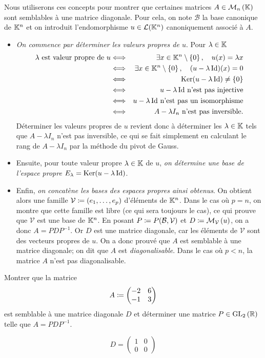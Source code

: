 \documentclass{magnolia}
\begin{document}
Nous utiliserons ces concepts pour montrer que certaines matrices
$A\in\mathcal{M}_{n}\left(\mathbb{K}\right)$ sont semblables à une matrice diagonale. Pour cela, on note
$\mathcal{B}$ la base canonique de $\mathbb{K}^n$ et on introduit
l'endomorphisme $u\in\mathcal{L}(\mathbb{K}^n)$ canoniquement associé à $A$.
\begin{itemize}
\item \emph{On commence par déterminer les valeurs propres de $u$}. Pour $\lambda\in\mathbb{K}$
\begin{eqnarray*}
\text{$\lambda$ est valeur propre de $u$}
&\Longleftrightarrow& \exists x\in \mathbb{K}^n \setminus\left\{0\right\} ,\quad u(x)=\lambda x\\
&\Longleftrightarrow& \exists x\in \mathbb{K}^n \setminus\left\{0\right\} ,\quad (u-\lambda \operatorname{Id})(x)=0\\
&\Longleftrightarrow& \mathop{\rm Ker}(u-\lambda \operatorname{Id})\neq\left\{0\right\}\\
&\Longleftrightarrow& \text{$u-\lambda \operatorname{Id}$ n'est pas injective}\\
&\Longleftrightarrow& \text{$u-\lambda \operatorname{Id}$ n'est pas un isomorphisme}\\
&\Longleftrightarrow& \text{$A-\lambda I_n$ n'est pas inversible.}
\end{eqnarray*}
Déterminer les valeurs propres de $u$ revient donc à déterminer les $\lambda\in\mathbb{K}$
tels que $A-\lambda I_n$ n'est pas inversible, ce qui se fait simplement en calculant
le rang de $A-\lambda I_n$ par la méthode du pivot de Gauss.
\item Ensuite, pour toute valeur propre $\lambda\in\mathbb{K}$ de $u$, \emph{on détermine une base
  de l'espace propre $E_\lambda=\mathop{\rm Ker}(u-\lambda \operatorname{Id})$}.
\item Enfin, \emph{on concatène les bases des espaces propres ainsi obtenus}. On obtient
  alors une famille $\mathcal{V}\coloneqq(e_1,\ldots,e_p)$ d'éléments de $\mathbb{K}^n$. Dans le cas où $p=n$, on montre
  que cette famille est libre (ce qui sera toujours le cas), ce qui
  prouve que $\mathcal{V}$ est une base de $\mathbb{K}^n$. En posant
  $P\coloneqq P(\mathcal{B},\mathcal{V})$ et $D\coloneqq \mathcal{M}_{\mathcal{V}}\left(u\right)$, on a
  donc $A=PDP^{-1}$. Or $D$ est une matrice
  diagonale, car les éléments de $\mathcal{V}$ sont des vecteurs propres de $u$.
  On a donc prouvé que $A$ est semblable à une matrice diagonale; on dit que
  $A$ est \emph{diagonalisable}. Dans le cas où $p<n$, la matrice $A$ n'est pas
  diagonalisable.
\end{itemize}

\begin{exoUnique}
\exo Montrer que la matrice
  \[A\coloneqq
    \begin{pmatrix}
    -2 & 6\\
    -1 & 3
    \end{pmatrix}\]
  est semblable à une matrice diagonale $D$ et déterminer une matrice
  $P\in{\rm GL}_{2}\left(\mathbb{R}\right)$ telle que $A=PDP^{-1}$.
  \begin{sol}
  \[D=
    \begin{pmatrix}
    1 & 0\\
    0 & 0
    \end{pmatrix}\]    
  \end{sol}
\end{exoUnique}
\end{document}
